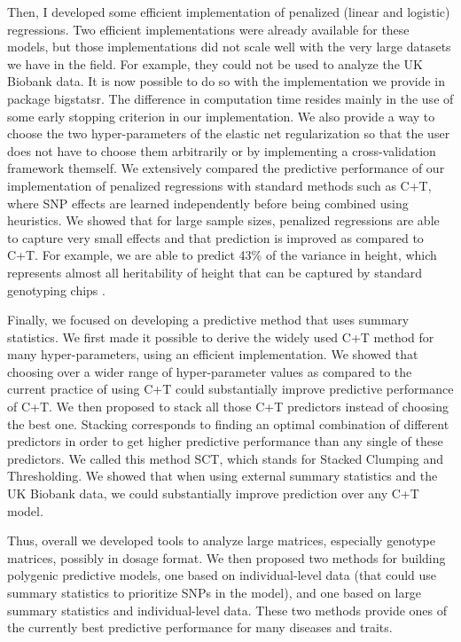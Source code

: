 Then, I developed some efficient implementation of penalized (linear and logistic) regressions. 
Two efficient implementations were already available for these models, but those implementations did not scale well with the very large datasets we have in the field. For example, they could not be used to analyze the UK Biobank data. 
It is now possible to do so with the implementation we provide in package bigstatsr. 
The difference in computation time resides mainly in the use of some early stopping criterion in our implementation. We also provide a way to choose the two hyper-parameters of the elastic net regularization so that the user does not have to choose them arbitrarily or by implementing a cross-validation framework themself.
We extensively compared the predictive performance of our implementation of penalized regressions with standard methods such as C+T, where SNP effects are learned independently before being combined using heuristics.
We showed that for large sample sizes, penalized regressions are able to capture very small effects and that prediction is improved as compared to C+T.
For example, we are able to predict 43\% of the variance in height, which represents almost all heritability of height that can be captured by standard genotyping chips \cite[]{yang2010common,accuheight2018}.  

Finally, we focused on developing a predictive method that uses summary statistics. We first made it possible to derive the widely used C+T method for many hyper-parameters, using an efficient implementation. 
We showed that choosing over a wider range of hyper-parameter values as compared to the current practice of using C+T could substantially improve predictive performance of C+T.
We then proposed to stack all those C+T predictors instead of choosing the best one. Stacking corresponds to finding an optimal combination of different predictors in order to get higher predictive performance than any single of these predictors. 
We called this method SCT, which stands for Stacked Clumping and Thresholding.
We showed that when using external summary statistics and the UK Biobank data, we could substantially improve prediction over any C+T model.

Thus, overall we developed tools to analyze large matrices, especially genotype matrices, possibly in dosage format.
We then proposed two methods for building polygenic predictive models, one based on individual-level data (that could use summary statistics to prioritize SNPs in the model), and one based on large summary statistics and individual-level data.
These two methods provide ones of the currently best predictive performance for many diseases and traits.   


